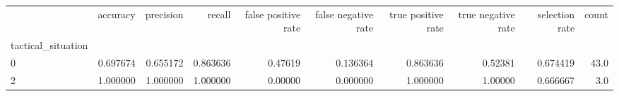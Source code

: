\begin{tabular}{lrrrrrrrrr}
\toprule
{} &  accuracy &  precision &    recall &  false positive rate &  false negative rate &  true positive rate &  true negative rate &  selection rate &  count \\
tactical\_situation &           &            &           &                      &                      &                     &                     &                 &        \\
\midrule
0                  &  0.697674 &   0.655172 &  0.863636 &              0.47619 &             0.136364 &            0.863636 &             0.52381 &        0.674419 &   43.0 \\
2                  &  1.000000 &   1.000000 &  1.000000 &              0.00000 &             0.000000 &            1.000000 &             1.00000 &        0.666667 &    3.0 \\
\bottomrule
\end{tabular}
